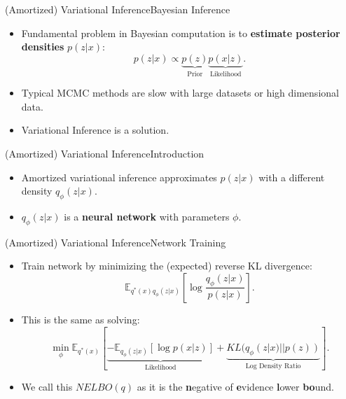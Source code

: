 \documentclass[handout]{beamer}
\newcommand{\E}{\mathbb{E}}
\begin{document}
\begin{frame}{(Amortized) Variational Inference}{Bayesian Inference}
  \begin{itemize}
  \item {
    Fundamental problem in Bayesian computation is to \textbf{estimate posterior densities} $p(z|x)$:
  }
  \begin{equation*}
p(z|x)\propto \underbrace{p(z)}_\text{Prior}\underbrace{p(x|z)}_\text{Likelihood}.
\end{equation*}
  \item {
    Typical MCMC methods are slow with large datasets or high dimensional data.
  }
  \vspace{0.5cm}
  \item {
    Variational Inference is a solution.
  }
  \end{itemize}
\end{frame}
\begin{frame}{(Amortized) Variational Inference}{Introduction}
\begin{itemize}
\item Amortized variational inference approximates $p(z|x)$ with a different density $q_\phi(z|x)$.
\item $q_\phi(z|x)$ is a \textbf{neural network} with parameters $\phi$.
\begin{figure}[h]
  \centering
\end{figure}
\end{itemize}
\end{frame}
\begin{frame}{(Amortized) Variational Inference}{Network Training}
\begin{itemize}
\item Train network by minimizing the (expected) reverse KL divergence:
\[\mathbb{E}_{q^*(x)q_\phi(z|x)}\left[\log \frac{q_\phi(z|x)}{p(z|x)}\right].\]
\item This is the same as solving:
\[\min_\phi \E_{q^*(x)}[\underbrace{-\mathbb{E}_{q_\phi(z|x)}[\log p(x|z)]}_{\text{Likelihood}}+\underbrace{KL(q_\phi(z|x)||p(z))}_{\text{Log Density Ratio}}].\]
\item We call this $NELBO(q)$ as it is the \textbf{n}egative of \textbf{e}vidence \textbf{l}ower \textbf{bo}und.
\end{itemize}
\end{frame}
\end{document}
